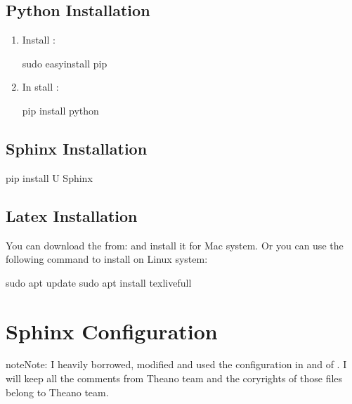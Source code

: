 \documentclass[letterpaper,12pt,english]{sphinxmanual}
\begin{document}
\section{Python Installation}
\label{\detokenize{pkgs:python-installation}}\begin{enumerate}
\def\theenumi{\arabic{enumi}}
\def\labelenumi{\theenumi .}
\makeatletter\def\p@enumii{\p@enumi \theenumi .}\makeatother
\item {} 
Install :

\begin{sphinxVerbatim}[commandchars=\\\{\}]
sudo easy\PYGZus{}install pip
\end{sphinxVerbatim}

\item {} 
In stall :

\begin{sphinxVerbatim}[commandchars=\\\{\}]
pip install python
\end{sphinxVerbatim}

\end{enumerate}


\section{Sphinx Installation}
\label{\detokenize{pkgs:sphinx-installation}}
\begin{sphinxVerbatim}[commandchars=\\\{\}]
pip install \PYGZhy{}U Sphinx
\end{sphinxVerbatim}


\section{Latex Installation}
\label{\detokenize{pkgs:latex-installation}}
You can download the  from:  and install it for Mac system. Or you can use the following command to install  on Linux system:

\begin{sphinxVerbatim}[commandchars=\\\{\}]
sudo apt update  sudo apt install texlive\PYGZhy{}full
\end{sphinxVerbatim}


\chapter{Sphinx Configuration}
\label{\detokenize{sphinx:sphinx-configuration}}\label{\detokenize{sphinx:sphinx}}\label{\detokenize{sphinx::doc}}
\begin{sphinxadmonition}{note}{Note:}
I heavily borrowed, modified and used the configuration in  and  of . I will keep all the comments from Theano team and the coryrights of those files belong to Theano team.
\end{sphinxadmonition}
\end{document}
